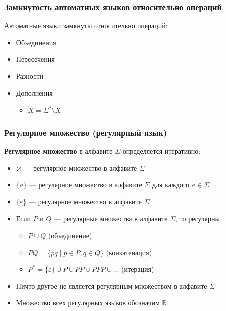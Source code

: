 \documentclass{beamer}
\begin{document}
\begin{frame}[fragile]
  \transwipe[direction=90]
  \frametitle{Замкнутость автоматных языков относительно операций}
  Автоматные языки замкнуты относительно операций: 

  \begin{itemize}
    \item Объединения
    \item Пересечения
    \item Разности
    \item Дополнения
    \begin{itemize}
      \item $\overline{X} = \Sigma^* \setminus X$
    \end{itemize}
  \end{itemize}
\end{frame}

\begin{frame}[fragile]
  \transwipe[direction=90]
  \frametitle{Регулярное множество (регулярный язык)}
    \textbf{Регулярное множество} в алфавите $\Sigma$ определяется итеративно:

    \begin{itemize}
      \item $\varnothing $ --- регулярное множество в алфавите $\Sigma$
      \item $\{a\}$  --- регулярное множество в алфавите $\Sigma$ для каждого $a \in \Sigma$
      \item $\{\varepsilon\}$  --- регулярное множество в алфавите $\Sigma$
      \item Если $P$ и $Q$ --- регулярные множества в алфавите $\Sigma$, то регулярны
      \begin{itemize}
        \item $P \cup Q$ \hfill (объединение)
        \item $PQ = \{ pq \mid p \in P, q \in Q\}$ \hfill (конкатенация)
        \item $P^* = \{\varepsilon\} \cup P \cup PP \cup PPP \cup \dots $ \hfill (итерация)
      \end{itemize}
      \item Ничто другое не является регулярным множеством в алфавите $\Sigma$
      \item Множество всех регулярных языков обозначим $\mathbb{R}$
    \end{itemize}
\end{frame}
\end{document}
